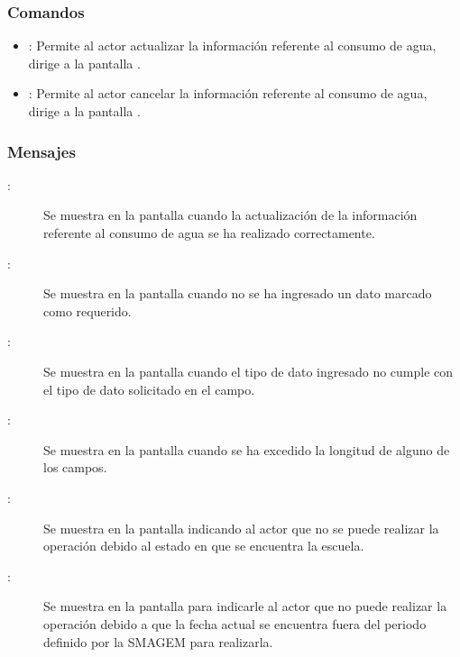 \subsubsection{Comandos}
    \begin{itemize}
	\item {}: Permite al actor actualizar la información referente al consumo de agua, dirige a la pantalla .
	\item {}: Permite al actor cancelar la información referente al consumo de agua, dirige a la pantalla .
    \end{itemize}

\subsubsection{Mensajes}

    \begin{description}
	  \item [:] Se muestra en la pantalla  cuando la actualización de la información referente al consumo de agua se ha realizado correctamente.
	    
	  \item [:] Se muestra en la pantalla  cuando no se ha ingresado un dato marcado como requerido.
	    
	  \item  [:] Se muestra en la pantalla  cuando el tipo de dato ingresado no cumple con el tipo de dato solicitado en el campo.
	    
	  \item [:] Se muestra en la pantalla  cuando se ha excedido la longitud de alguno de los campos.	    
	  
	  \item [:] Se muestra en la pantalla  indicando al actor que no se puede realizar la operación debido al estado en que se encuentra la escuela.
	    
	    \item [:] Se muestra en la pantalla  para indicarle al actor que no puede realizar la operación debido a que la fecha actual se encuentra fuera del periodo definido por la SMAGEM para realizarla.
    \end{description}
